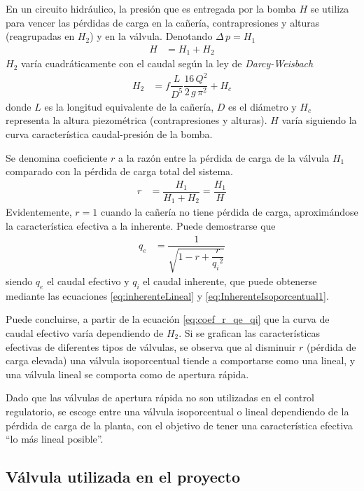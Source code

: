 En un circuito hidráulico, la presión que es entregada por la bomba $H$ se 
utiliza para vencer las pérdidas de carga en la cañería, contrapresiones y 
alturas (reagrupadas en $H_2$) y en la válvula.
Denotando $\Delta \,p = H_1$
\begin{align}
 H &= H_1 + H_2
\end{align}
$H_2$ varía cuadráticamente con el caudal según la ley de \emph{Darcy-Weisbach}
\cite{bib:Franzini}
\begin{align}
 H_2  &= f \dfrac{L}{D^5}\dfrac{16\,Q^2}{2\,g\,\pi^2} + H_c
\end{align}
donde $L$ es la longitud equivalente de la cañería, $D$ es el diámetro y $H_c$
representa la altura piezométrica (contrapresiones y alturas).
$H$ varía siguiendo la curva característica caudal-presión de la bomba.

Se denomina coeficiente $r$ a la razón entre la pérdida de carga de la válvula
$H_1$ comparado con la pérdida de carga total del sistema.
\begin{align}
 r &= \dfrac{H_1}{H_1+H_2} = \dfrac{H_1}{H}
\end{align}
Evidentemente, $r = 1$ cuando la cañería no tiene pérdida de carga,
aproximándose la característica efectiva a la inherente.
Puede demostrarse \cite{bib:Creus} que
\begin{align}
 q_e &= \dfrac{1}{\sqrt{1-r+\dfrac{r}{{q_i}^2}}}
 \label{eq:coef_r_qe_qi}
\end{align}
siendo $q_e$ el caudal efectivo y $q_i$ el caudal inherente, que puede
obtenerse mediante las ecuaciones \eqref{eq:inherenteLineal} y
\eqref{eq:InherenteIsoporcentual1}.

Puede concluirse, a partir de la ecuación \eqref{eq:coef_r_qe_qi} que la curva
de caudal efectivo varía dependiendo de $H_2$.
Si se grafican las características efectivas de diferentes tipos de válvulas,
se observa que al disminuir $r$ (pérdida de carga elevada) una válvula
isoporcentual tiende a comportarse como una lineal,
y una válvula lineal se comporta como de apertura rápida.

Dado que las válvulas de apertura rápida no son utilizadas en el control
regulatorio, se escoge entre una válvula isoporcentual o lineal dependiendo de
la pérdida de carga de la planta, con el objetivo de tener una característica
efectiva ``lo más lineal posible''.

\subsection{Válvula utilizada en el proyecto}


